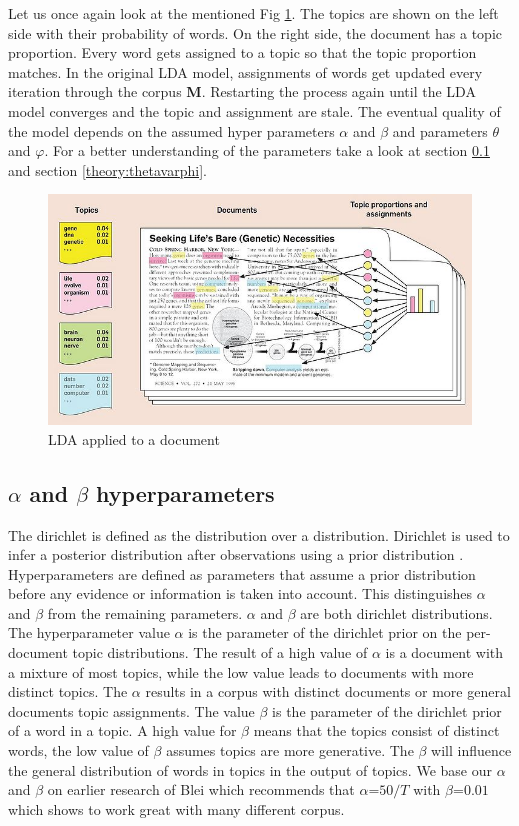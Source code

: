 Let us once again look at the mentioned Fig \ref{fig:LDA_example}. The topics are shown on the left side with their probability of words. On the right side, the document has a topic proportion. Every word gets assigned to a topic so that the topic proportion matches.  
In the original LDA model, assignments of words get updated every iteration through the corpus \textbf{M}. Restarting the process again until the LDA model converges and the topic and assignment are stale. The eventual quality of the model depends on the assumed hyper parameters $\alpha$ and $\beta$ and parameters $\theta$ and $\varphi$. For a better understanding of the parameters take a look at section \ref{theory:alphabeta} and section \ref{theory:thetavarphi}.

\begin{figure}
    \centering
    \includegraphics[scale=0.6]{methodology/700px-Illustrating_LDA.jpg}
    \caption{LDA applied to a document}
    \label{fig:LDA_example}
\end{figure}

\subsection{$\alpha$ and $\beta$ hyperparameters} \label{theory:alphabeta}
The dirichlet is defined as the distribution over a distribution. Dirichlet is used to infer a posterior distribution after observations using a prior distribution \cite{Sethuraman2001APRIORS}. Hyperparameters are defined as parameters that assume a prior distribution before any evidence or information is taken into account. This distinguishes $\alpha$ and $\beta$ from the remaining parameters. $\alpha$ and $\beta$ are both dirichlet distributions. The hyperparameter value $\alpha$ is the parameter of the dirichlet prior on the per-document topic distributions. The result of a high value of $\alpha$ is a document with a mixture of most topics, while the low value leads to documents with more distinct topics. The $\alpha$ results in a corpus with distinct documents or more general documents topic assignments. The value $\beta$ is the parameter of the dirichlet prior of a word in a topic. A high value for $\beta$ means that the topics consist of distinct words, the low value of $\beta$ assumes topics are more generative. The $\beta$ will influence the general distribution of words in topics in the output of topics. 
We base our $\alpha$ and $\beta$ on earlier research of Blei which recommends that $\alpha $=$ 50/T$ with $\beta $=$ 0.01$ which shows to work great with many different corpus.

